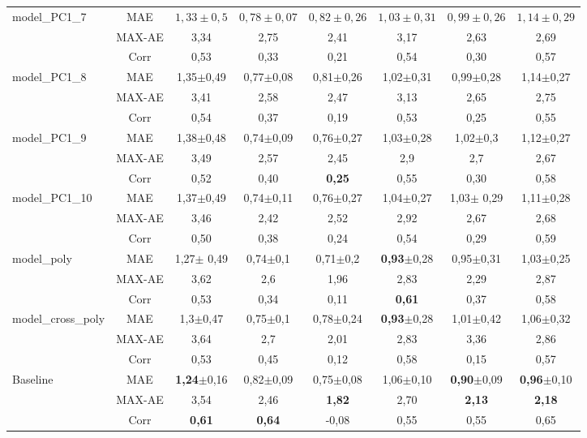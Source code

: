 \begin{table}[h!]
\begin{center}
\begin{tabular}{lc||c|c|c|c|c|c}
			\hline
			model\_PC1\_7&MAE &$1,33\pm{0,5}$&$0,78\pm{0,07}$&$0,82\pm{0,26}$&$1,03\pm{0,31}$&$0,99\pm{0,26}$&$1,14\pm{0,29}$\\
			&MAX-AE &3,34&2,75&2,41&3,17&2,63&2,69\\
			&Corr &0,53&0,33&0,21&0,54&0,30&0,57\\
			
			\hline
			model\_PC1\_8&MAE & 1,35$\pm$0,49 & 0,77$\pm$0,08& 0,81$\pm$0,26&1,02$\pm$0,31& 0,99$\pm$0,28 & 1,14$\pm$0,27\\
			&MAX-AE &3,41&2,58&2,47&3,13&2,65&2,75\\
			&Corr &0,54&0,37&0,19&0,53&0,25&0,55\\
			
			\hline
			model\_PC1\_9&MAE & 1,38$\pm$0,48 & 0,74$\pm$0,09 & 0,76$\pm$0,27 & 1,03$\pm$0,28 & 1,02$\pm$0,3 & 1,12$\pm$0,27\\
			&MAX-AE &3,49&2,57&2,45&2,9&2,7&2,67\\
			&Corr &0,52&0,40&\textbf{0,25}&0,55&0,30&0,58\\
			
			\hline
			model\_PC1\_10&MAE & 1,37$\pm$0,49 & 0,74$\pm$0,11 & 0,76$\pm$0,27 & 1,04$\pm$0,27 & 1,03$\pm$ 0,29& 1,11$\pm$0,28\\
			&MAX-AE &3,46&2,42&2,52&2,92&2,67&2,68\\
			&Corr &0,50&0,38&0,24&0,54&0,29&0,59\\
			
			\hline
			model\_poly&MAE & 1,27$\pm$ 0,49 & 0,74$\pm$0,1 & 0,71$\pm$0,2 & \textbf{0,93}$\pm$0,28 & 0,95$\pm$0,31 & 1,03$\pm$0,25\\
			&MAX-AE &3,62&2,6&1,96&2,83&2,29&2,87\\
			&Corr &0,53&0,34&0,11&\textbf{0,61}&0,37&0,58\\
			
			\hline
			model\_cross\_poly&MAE & 1,3$\pm$0,47 & 0,75$\pm$0,1 & 0,78$\pm$0,24 & \textbf{0,93}$\pm$0,28 & 1,01$\pm$0,42 & 1,06$\pm$0,32 \\
			&MAX-AE &3,64&2,7&2,01&2,83&3,36&2,86\\
			&Corr &0,53&0,45&0,12&0,58&0,15&0,57\\
			\hline 
			
			Baseline& MAE & \textbf{1,24}$\pm$0,16 & 0,82$\pm$0,09 & 0,75$\pm$0,08 & 1,06$\pm$0,10 & \textbf{0,90}$\pm$0,09 & \textbf{0,96}$\pm$0,10 \\
			&MAX-AE & 3,54 & 2,46 & \textbf{1,82} & 2,70 & \textbf{2,13} & \textbf{2,18}\\
			&Corr   & \textbf{0,61} & \textbf{0,64} &-0,08 & 0,55 & 0,55 & 0,65\\
			\hline
		\end{tabular}
	\end{center}
	\label{tab:H_testset}
\end{table}
